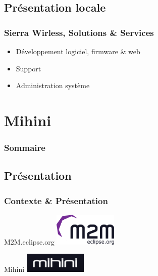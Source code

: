 \documentclass[slidetop,11pt]{beamer}
\begin{document}
\subsection{Présentation locale}
\begin{frame}
    \frametitle{Sierra Wirless, Solutions \& Services}
    \begin{itemize}
        \item Développement logiciel, firmware \& web
        \item Support
        \item Administration système
    \end{itemize}
\end{frame}

\section{Mihini}

\begin{frame}
    \frametitle{Sommaire}
\end{frame}

\subsection{Présentation}
\begin{frame}
    \frametitle{Contexte \& Présentation}
    \begin{block}{M2M.eclipse.org}
        \includegraphics[width=3cm]{img/M2M.png}
    \end{block}
    \begin{block}{Mihini}
        \includegraphics[width=3cm]{img/mihini_logo.png}
    \end{block}
\end{frame}
\end{document}
